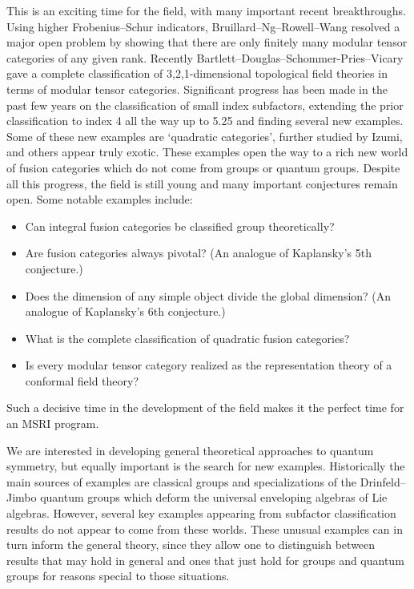 \documentclass[12pt]{article}
\begin{document}
This is an exciting time for the field, with many important recent breakthroughs. Using higher Frobenius--Schur indicators, Bruillard--Ng--Rowell--Wang resolved a major open problem by showing that there are only finitely many modular tensor categories of any given rank. Recently Bartlett--Douglas--Schommer-Pries--Vicary gave a complete classification of 3,2,1-dimensional topological field theories in terms of modular tensor categories. Significant progress has been made in the past few years on the classification of small index subfactors, extending the prior classification to index 4 all the way up to 5.25 and finding several new examples. Some of these new examples are `quadratic categories', further studied by Izumi, and others appear truly exotic. These examples open the way to a rich new world of fusion categories which do not come from groups or quantum groups.  Despite all this progress, the field is still young and many important conjectures remain open. Some notable examples include:
\begin{itemize}
  \setlength{\itemsep}{1pt}
  \setlength{\parskip}{0pt}
  \setlength{\parsep}{0pt}
\item Can integral fusion categories be classified group theoretically?
\item Are fusion categories always pivotal? (An analogue of Kaplansky's 5th conjecture.)
\item Does the dimension of any simple object divide the global dimension? (An analogue of Kaplansky's 6th conjecture.)
\item What is the complete classification of quadratic fusion categories?
\item Is every modular tensor category realized as the representation theory of a conformal field theory?
\end{itemize}
Such a decisive time in the development of the field makes it the perfect time for an MSRI program.

We are interested in developing general theoretical approaches to quantum symmetry, but equally important is the search for new examples. Historically the main sources of examples are classical groups and specializations of the Drinfeld--Jimbo quantum groups which deform the universal enveloping algebras of Lie algebras. However, several key examples appearing from subfactor classification results do not appear to come from these worlds. These unusual examples can in turn inform the general theory, since they allow one to distinguish between results that may hold in general and ones that just hold for groups and quantum groups for reasons special to those situations.
\end{document}
